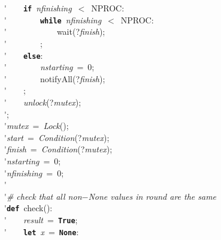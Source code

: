 \'\>~~~~\texttt{\textbf{if}}~\textit{nfinishing}~$<$~NPROC:\\

\'\>~~~~~~~~\texttt{\textbf{while}}~\textit{nfinishing}~$<$~NPROC:\\

\'\>~~~~~~~~~~~~wait(?\textit{finish});\\

\'\>~~~~~~~~;\\

\'\>~~~~\texttt{\textbf{else}}:\\

\'\>~~~~~~~~\textit{nstarting}~=~0;\\

\'\>~~~~~~~~notifyAll(?\textit{finish});\\

\'\>~~~~;\\

\'\>~~~~\textit{unlock}(?\textit{mutex});\\

\'\>;\\

\'\>\textit{mutex}~=~\textit{Lock}();\\

\'\>\textit{start}~=~\textit{Condition}(?\textit{mutex});\\

\'\>\textit{finish}~=~\textit{Condition}(?\textit{mutex});\\

\'\>\textit{nstarting}~=~0;\\

\'\>\textit{nfinishing}~=~0;\\

\'\>\\

\'\>\emph{\# check that all non$-$None values in round are the same}\\

\'\>\texttt{\textbf{def}}~check():\\

\'\>~~~~\textit{result}~=~\texttt{\textbf{True}};\\

\'\>~~~~\texttt{\textbf{let}}~\textit{x}~=~\texttt{\textbf{None}}:\\

